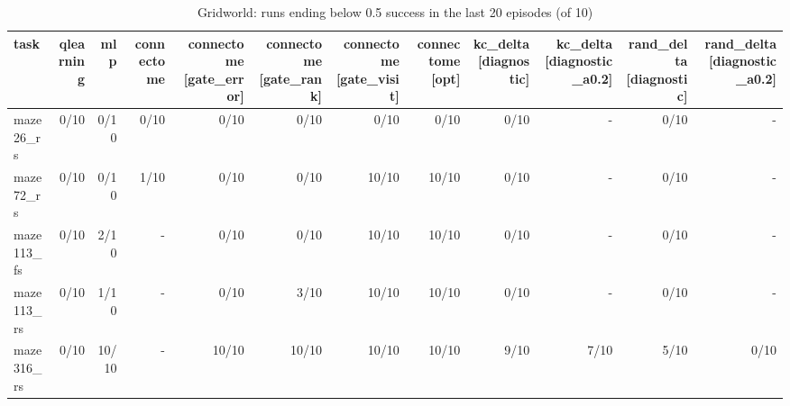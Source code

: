 \begin{table}[t]
\centering
\small
\begin{tabular}{lrrrrrrrrrrr}
\toprule
task & qlearning & mlp & connectome & connectome [gate\_error] & connectome [gate\_rank] & connectome [gate\_visit] & connectome [opt] & kc\_delta [diagnostic] & kc\_delta [diagnostic\_a0.2] & rand\_delta [diagnostic] & rand\_delta [diagnostic\_a0.2] \\
\midrule
maze26\_rs & 0/10 & 0/10 & 0/10 & 0/10 & 0/10 & 0/10 & 0/10 & 0/10 & - & 0/10 & - \\
maze72\_rs & 0/10 & 0/10 & 1/10 & 0/10 & 0/10 & 10/10 & 10/10 & 0/10 & - & 0/10 & - \\
maze113\_fs & 0/10 & 2/10 & - & 0/10 & 0/10 & 10/10 & 10/10 & 0/10 & - & 0/10 & - \\
maze113\_rs & 0/10 & 1/10 & - & 0/10 & 3/10 & 10/10 & 10/10 & 0/10 & - & 0/10 & - \\
maze316\_rs & 0/10 & 10/10 & - & 10/10 & 10/10 & 10/10 & 10/10 & 9/10 & 7/10 & 5/10 & 0/10 \\
\bottomrule
\end{tabular}
\caption{Gridworld: runs ending below 0.5 success in the last 20 episodes (of 10)}
\label{tab:gridworld_failed_final}
\end{table}
